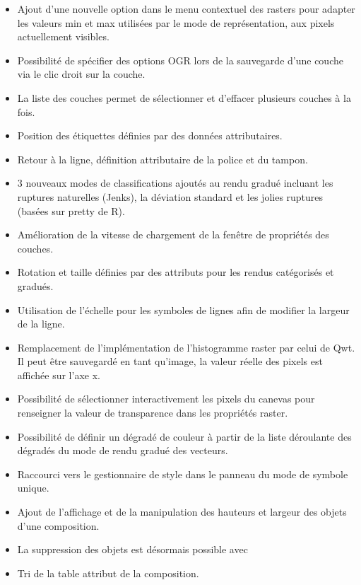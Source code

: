
\begin{itemize}[label=--]
\item Ajout d'une nouvelle option dans le menu contextuel des rasters pour adapter les valeurs min et max utilisées par le mode de représentation, aux pixels actuellement visibles. 
\item Possibilité de spécifier des options OGR lors de la sauvegarde d'une couche via le clic droit sur la couche.
\item La liste des couches permet de sélectionner et d'effacer plusieurs couches à la fois.
\end{itemize}


\begin{itemize}[label=--]
\item Position des étiquettes définies par des données attributaires.
\item Retour à la ligne, définition attributaire de la police et du tampon.
\end{itemize}


\begin{itemize}[label=--]
\item 3 nouveaux modes de classifications ajoutés au rendu gradué incluant les ruptures naturelles (Jenks), la déviation standard et les jolies ruptures (basées sur pretty de R).
\item Amélioration de la vitesse de chargement de la fenêtre de propriétés des couches.
\item Rotation et taille définies par des attributs pour les rendus catégorisés et gradués.
\item Utilisation de l'échelle pour les symboles de lignes afin de modifier la largeur de la ligne.
\item Remplacement de l'implémentation de l'histogramme raster par celui de Qwt. Il peut être sauvegardé en tant qu'image, la valeur réelle des pixels est affichée sur l'axe x.
\item Possibilité de sélectionner interactivement les pixels du canevas pour renseigner la valeur de transparence dans les propriétés raster.
\item Possibilité de définir un dégradé de couleur à partir de la liste déroulante des dégradés du mode de rendu gradué des vecteurs.
\item Raccourci vers le gestionnaire de style dans le panneau du mode de symbole unique.
\end{itemize}


\begin{itemize}[label=--]
\item Ajout de l'affichage et de la manipulation des hauteurs et largeur des objets d'une composition.
\item La suppression des objets est désormais possible avec 
\item Tri de la table attribut de la composition.
\end{itemize}
